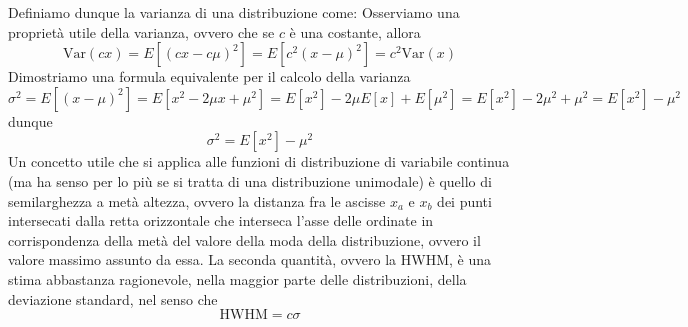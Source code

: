 \documentclass{report}
\begin{document}
Definiamo dunque la varianza di una distribuzione come:
\noindent Osserviamo una proprietà utile della varianza, ovvero che se $c$ è una costante, allora
$$
	\text{Var}(cx) = E[(cx - c\mu)^2] = E[c^2(x - \mu)^2] = c^2 \text{Var}(x) 
$$
Dimostriamo una formula equivalente per il calcolo della varianza
\begin{equation*}
	\sigma^2 = E[(x - \mu)^2] = E[x^2 - 2 \mu x + \mu^2] = E[x^2] - 2 \mu E[x] + E[\mu^2] = E[x^2] - 2 \mu^2 + \mu^2 = E[x^2] - \mu^2
\end{equation*}
dunque
\begin{equation}
	\sigma^2 = E[x^2] - \mu^2
	\label{eq:calcolo_sigma}
\end{equation}
Un concetto utile che si applica alle funzioni di distribuzione di variabile continua (ma ha senso per lo più se si tratta di una distribuzione unimodale) è quello di semilarghezza a metà altezza, ovvero la distanza fra le ascisse $x_a$ e $x_b$ dei punti intersecati dalla retta orizzontale che interseca l'asse delle ordinate in corrispondenza della metà del valore della moda della distribuzione, ovvero il valore massimo assunto da essa. 
\noindent La seconda quantità, ovvero la HWHM, è una stima abbastanza ragionevole, nella maggior parte delle distribuzioni, della deviazione standard, nel senso che
\begin{equation}
	\text{HWHM} = c \sigma
\end{equation}
\end{document}
